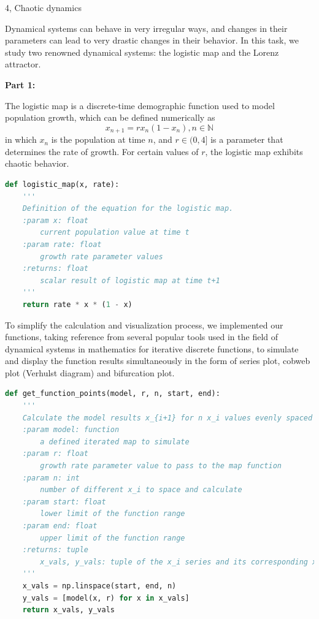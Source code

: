 \documentclass[10pt,a4paper]{article}
\begin{document}
\begin{task}{4, Chaotic dynamics}

\bigskip
Dynamical systems can behave in very irregular ways, and changes in their parameters can lead to very drastic changes in their behavior. In this task, we study two renowned dynamical systems: the logistic map and the Lorenz attractor.

\bigskip
\noindent \textbf{Part 1:}

The logistic map is a discrete-time demographic function used to model population growth, which can be defined numerically as 
\begin{equation}
    x_{n+1}=rx_n(1-x_n), n\in \mathbb{N}
\end{equation}
in which $x_n$ is the population at time $n$, and $r\in (0,4]$ is a parameter that determines the rate of growth. For certain values of $r$, the logistic map exhibits chaotic behavior.

\begin{lstlisting}[language = Python,  label = {cusp_method}]
def logistic_map(x, rate):
    '''
    Definition of the equation for the logistic map.
    :param x: float
        current population value at time t
    :param rate: float
        growth rate parameter values
    :returns: float
        scalar result of logistic map at time t+1
    '''
    return rate * x * (1 - x)
\end{lstlisting}

To simplify the calculation and visualization process, we implemented our functions, taking reference from several popular tools used in the field of dynamical systems in mathematics for iterative discrete functions, to simulate and display the function results simultaneously in the form of series plot, cobweb plot (Verhulst diagram) and bifurcation plot. 

\begin{lstlisting}[language = Python, label = {cusp_method}] 
def get_function_points(model, r, n, start, end):
    '''
    Calculate the model results x_{i+1} for n x_i values evenly spaced between [start, end] period.
    :param model: function
        a defined iterated map to simulate
    :param r: float
        growth rate parameter value to pass to the map function
    :param n: int
        number of different x_i to space and calculate
    :param start: float
        lower limit of the function range
    :param end: float
        upper limit of the function range
    :returns: tuple
        x_vals, y_vals: tuple of the x_i series and its corresponding x_{i+1} values
    '''
    x_vals = np.linspace(start, end, n)
    y_vals = [model(x, r) for x in x_vals]
    return x_vals, y_vals


\end{lstlisting}
\end{task}
\end{document}
